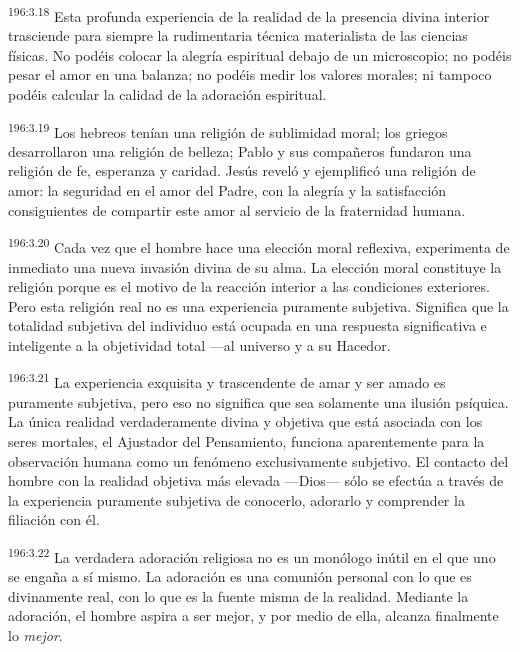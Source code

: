 \par 
\textsuperscript{196:3.18} Esta profunda experiencia de la realidad de la presencia divina interior trasciende para siempre la rudimentaria técnica materialista de las ciencias físicas. No podéis colocar la alegría espiritual debajo de un microscopio; no podéis pesar el amor en una balanza; no podéis medir los valores morales; ni tampoco podéis calcular la calidad de la adoración espiritual.

\par 
\textsuperscript{196:3.19} Los hebreos tenían una religión de sublimidad moral; los griegos desarrollaron una religión de belleza; Pablo y sus compañeros fundaron una religión de fe, esperanza y caridad. Jesús reveló y ejemplificó una religión de amor: la seguridad en el amor del Padre, con la alegría y la satisfacción consiguientes de compartir este amor al servicio de la fraternidad humana.

\par 
\textsuperscript{196:3.20} Cada vez que el hombre hace una elección moral reflexiva, experimenta de inmediato una nueva invasión divina de su alma. La elección moral constituye la religión porque es el motivo de la reacción interior a las condiciones exteriores. Pero esta religión real no es una experiencia puramente subjetiva. Significa que la totalidad subjetiva del individuo está ocupada en una respuesta significativa e inteligente a la objetividad total ---al universo y a su Hacedor.

\par 
\textsuperscript{196:3.21} La experiencia exquisita y trascendente de amar y ser amado es puramente subjetiva, pero eso no significa que sea solamente una ilusión psíquica. La única realidad verdaderamente divina y objetiva que está asociada con los seres mortales, el Ajustador del Pensamiento, funciona aparentemente para la observación humana como un fenómeno exclusivamente subjetivo. El contacto del hombre con la realidad objetiva más elevada ---Dios--- sólo se efectúa a través de la experiencia puramente subjetiva de conocerlo, adorarlo y comprender la filiación con él.

\par 
\textsuperscript{196:3.22} La verdadera adoración religiosa no es un monólogo inútil en el que uno se engaña a sí mismo. La adoración es una comunión personal con lo que es divinamente real, con lo que es la fuente misma de la realidad. Mediante la adoración, el hombre aspira a ser mejor, y por medio de ella, alcanza finalmente lo \textit{mejor}.

